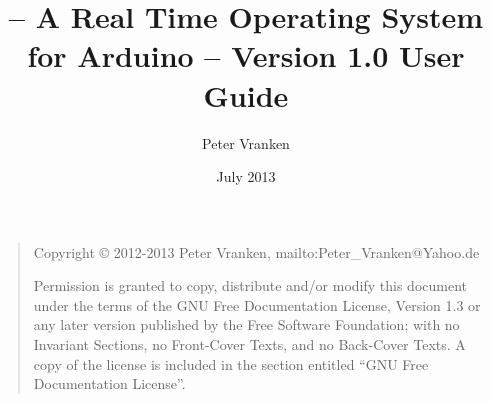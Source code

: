 \documentclass[10pt,twoside,a4paper,openany]{report}
\title{\rtos{} \linebreak
       -- A Real Time Operating System for Arduino -- \linebreak
       Version 1.0 \linebreak
       User Guide}
\author{Peter Vranken}
\date{July 2013}
\begin{document}
\maketitle

\bigskip
\begin{quote}
    Copyright \copyright{} 2012-2013  Peter Vranken, mailto:Peter\_Vranken@Yahoo.de
    
    Permission is granted to copy, distribute and/or modify this document
    under the terms of the GNU Free Documentation License, Version 1.3
    or any later version published by the Free Software Foundation;
    with no Invariant Sections, no Front-Cover Texts, and no Back-Cover Texts.
    A copy of the license is included in the section entitled ``GNU
    Free Documentation License''.
\end{quote}
\bigskip


\tableofcontents {}






\end{document}
